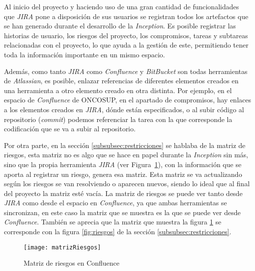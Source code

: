 Al inicio del proyecto y haciendo uso de una gran cantidad de funcionalidades que \emph{JIRA} pone a disposición de sus usuarios se registran todos los artefactos que se han generado durante el desarrollo de la \emph{Inception}. Es posible registrar las historias de usuario, los riesgos del proyecto, los compromisos, tareas y subtareas relacionadas con el proyecto, lo que ayuda a la gestión de este, permitiendo tener toda la información importante en un mismo espacio. 

Además, como tanto \emph{JIRA} como \emph{Confluence} y \emph{BitBucket} son todas herramientas de \emph{Atlassian}, es posible, enlazar referencias de diferentes elementos creados en una herramienta a otro elemento creado en otra distinta. Por ejemplo, en el espacio de \emph{Confluence} de ONCOSUP, en el apartado de compromisos, hay enlaces a los elementos creados en \emph{JIRA}, dónde están especificados, o al subir código al repositorio (\emph{commit}) podemos referenciar la tarea con la que corresponde la codificación que se va a subir al repositorio.

Por otra parte, en la sección \ref{subsubsec:restricciones} se hablaba de la matriz de riesgos, esta matriz no es algo que se hace en papel durante la \emph{Inception} sin más, sino que la propia herramienta \emph{JIRA} (ver Figura~\ref{fig:matrizRiesgos}), con la información que se aporta al registrar un riesgo, genera esa matriz. Esta matriz se va actualizando según los riesgos se van resolviendo o aparecen nuevos, siendo lo ideal que al final del proyecto la matriz esté vacía. La matriz de riesgos se puede ver tanto desde \emph{JIRA} como desde el espacio en \emph{Confluence}, ya que ambas herramientas se sincronizan, en este caso la matriz que se muestra es la que se puede ver desde \emph{Confluence}. También se aprecia que la matriz que muestra la figura \ref{fig:matrizRiesgos} se corresponde con la figura \ref{fig:riesgos} de la sección \ref{subsubsec:restricciones}.
\\
\begin{figure}[!h]
\begin{center}
\texttt{[image: matrizRiesgos]}
\caption{Matriz de riesgos en Confluence}
\label{fig:matrizRiesgos}
\end{center}
\end{figure}
\\
\\
\\
\\
\\

